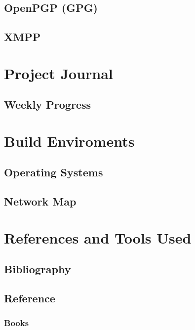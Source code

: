 \documentclass[a4paper,12pt]{report}
\begin{document}
\section{OpenPGP (GPG)}

\section{XMPP}


\chapter{Project Journal}

\label{chap:journal}

\section{Weekly Progress}

\label{sec:progress}

\chapter{Build Enviroments}

\section{Operating Systems}



\section{Network Map}




\chapter{References and Tools Used}

\section{Bibliography}

\section{Reference}



\subsection{Books}
\end{document}
